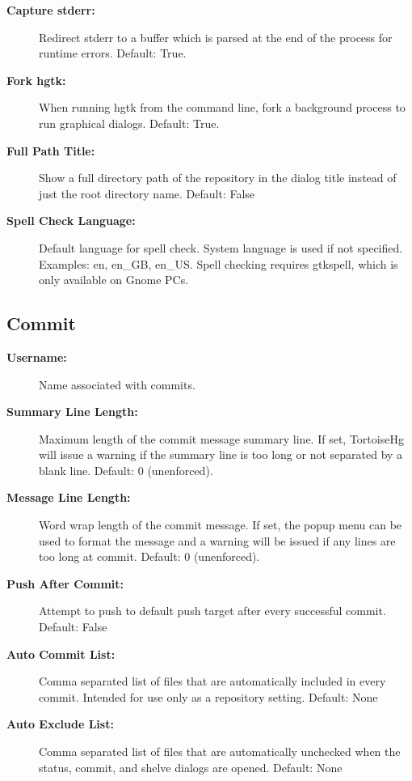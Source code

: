 \documentclass[letterpaper,10pt,english]{manual}
\begin{document}
\begin{description}
\item[\textbf{Capture stderr:}]
Redirect stderr to a buffer which is parsed at the end of the process
for runtime errors. Default: True.

\item[\textbf{Fork hgtk:}]
When running hgtk from the command line, fork a background process
to run graphical dialogs. Default: True.

\item[\textbf{Full Path Title:}]
Show a full directory path of the repository in the dialog title
instead of just the root directory name.  Default: False

\item[\textbf{Spell Check Language:}]
Default language for spell check.  System language is used if not
specified.  Examples: en, en\_GB, en\_US.  Spell checking requires
gtkspell, which is only available on Gnome PCs.

\end{description}
\hypertarget{module-commit.settings}{}

\subsection{Commit}
\begin{description}
\item[\textbf{Username:}]
Name associated with commits.

\item[\textbf{Summary Line Length:}]
Maximum length of the commit message summary line.
If set, TortoiseHg will issue a warning if the
summary line is too long or not separated by a
blank line. Default: 0 (unenforced).

\item[\textbf{Message Line Length:}]
Word wrap length of the commit message.  If
set, the popup menu can be used to format
the message and a warning will be issued
if any lines are too long at commit.
Default: 0 (unenforced).

\item[\textbf{Push After Commit:}]
Attempt to push to default push target after every successful
commit.  Default: False

\item[\textbf{Auto Commit List:}]
Comma separated list of files that are automatically included in
every commit.  Intended for use only as a repository setting.
Default: None

\item[\textbf{Auto Exclude List:}]
Comma separated list of files that are automatically unchecked when
the status, commit, and shelve dialogs are opened.  Default: None

\end{description}
\hypertarget{module-changelog.settings}{}
\end{document}
